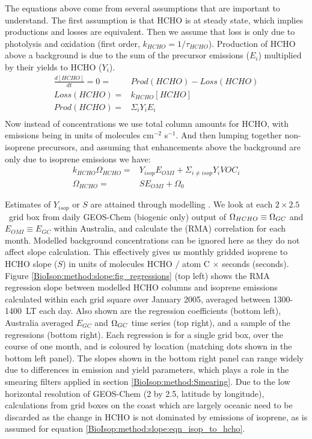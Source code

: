     The equations above come from several assumptions that are important to understand.
    The first assumption is that HCHO %
    is at steady state, which implies productions and losses are equivalent.
    Then we assume that loss is only due to photolysis and oxidation (first order, $k_{HCHO} = 1/\tau_{HCHO}$).
    Production of HCHO above a background is due to the sum of the precursor emissions ($E_i$) multiplied by their yields to HCHO ($Y_i$).
    \begin{eqnarray*}
      \frac{d [ HCHO ] }{dt} = 0 = & Prod(HCHO) - Loss(HCHO) \\
      Loss(HCHO)  = & k_{HCHO} [ HCHO ] \\
      Prod(HCHO)  = & \Sigma_i Y_i E_i  \\
    \end{eqnarray*}
    Now instead of concentrations we use total column amounts for HCHO, with emissions being in units of molecules cm$^{-2}$ s$^{-1}$.
    And then lumping together non-isoprene precursors, and assuming that enhancements above the background are only due to isoprene emissions we have: 
    \begin{eqnarray*}
    k_{HCHO} \Omega_{HCHO} = & Y_{isop} E_{OMI} + \Sigma_{i \ne isop} Y_{i} VOC_{i} \\
    \Omega_{HCHO} = & S E_{OMI} + \Omega_{0}
    \end{eqnarray*}
    
    
    Estimates of $Y_{isop}$ or $S$ are attained through modelling \parencite[e.g.][]{Millet2006}.
    We look at each $2\times2.5$~\degr grid box from daily GEOS-Chem (biogenic only) output of $\Omega_{HCHO} \equiv \Omega_{GC}$ and $E_{OMI} \equiv E_{GC}$ within Australia, and calculate the (RMA) correlation for each month.
    Modelled background concentrations can be ignored here as they do not affect slope calculation.
    This effectively gives us monthly gridded isoprene to HCHO slope ($S$) in units of molecules HCHO $/$ atom C $\times$ seconds (seconds).
    Figure \ref{BioIsop:method:slope:fig_regressions} (top left) shows the RMA regression slope between modelled HCHO columns and isoprene emissions calculated within each grid square over January 2005, averaged between 1300-1400~LT each day.
    Also shown are the regression coefficients (bottom left), Australia averaged $E_{GC}$ and $\Omega_{GC}$ time series (top right), and a sample of the regressions (bottom right).
    Each regression is for a single grid box, over the course of one month, and is coloured by location (matching dots shown in the bottom left panel).
    The slopes shown in the bottom right panel can range widely due to differences in emission and yield parameters, which plays a role in the smearing filters applied in section \ref{BioIsop:method:Smearing}.
    Due to the low horizontal resolution of GEOS-Chem (2 by 2.5\degr, latitude by longitude), calculations from grid boxes on the coast which are largely oceanic need to be discarded as the change in HCHO is not dominated by emissions of isoprene, as is assumed for equation \ref{BioIsop:method:slope:eqn_isop_to_hcho}.
    
